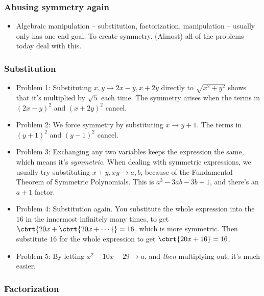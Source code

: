 \documentclass[10pt,paper=letter]{scrartcl}
\begin{document}
\subsubsection*{Abusing symmetry again}

\begin{itemize}
  \item Algebraic manipulation -- substitution, factorization, manipulation -- usually only has one end goal. To create symmetry. (Almost) all of the problems today deal with this.
\end{itemize}

\newpage

\subsubsection*{Substitution}

\begin{itemize}
  \item Problem 1: Substituting $x, y \to 2x - y, x + 2y$ directly to $\sqrt{x^2 + y^2}$ shows that it's multiplied by $\sqrt{5}$ each time. The symmetry arises when the terms in $(2x - y)^2$ and $(x + 2y)^2$ cancel.
  \item Problem 2: We force symmetry by substituting $x \to y + 1$. The terms in $(y + 1)^2$ and $(y - 1)^2$ cancel.
  \item Problem 3: Exchanging any two variables keeps the expression the same, which means it's \emph{symmetric}. When dealing with symmetric expressions, we usually try substituting $x+y, xy \to a, b$, because of the Fundamental Theorem of Symmetric Polynomials. This is $a^3 - 3ab - 3b + 1$, and there's an $a+1$ factor. 
  \item Problem 4: Substitution again. You substitute the whole expression into the $16$ in the innermost infinitely many times, to get $\cbrt{20x + \cbrt{20x + \cdots}} = 16$, which is more symmetric. Then substitute $16$ for the whole expression to get $\cbrt{20x + 16} = 16$.
  \item Problem 5: By letting $x^2 - 10x - 29 \rightarrow a$, and \emph{then} multiplying out, it's much easier.
\end{itemize}

\subsubsection*{Factorization}
\end{document}
